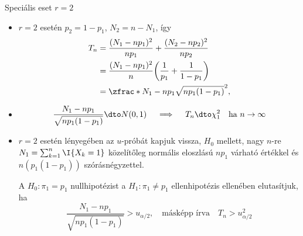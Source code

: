 \documentclass[aspectratio=169,notheorems,9pt,\option]{beamer}
\begin{document}
\begin{frame}{Speciális eset $r=2$}
  
  \begin{itemize}
    \item $r=2$ esetén $p_2=1-p_1$, $N_2=n-N_1$, így
    \begin{align*}
      T_n&=\frac{(N_1-np_1)^2}{np_1}+\frac{(N_2-np_2)^2}{np_2}
      \\
         &=
           \frac{(N_1-np_1)^2}n \zjel*{\frac1{p_1}+\frac1{1-p_1}}
      \\
         &
           =\zfrac*{N_1-np_1}{\sqrt{np_1(1-p_1)}}^2,\\
    \end{align*}
    \item  
    \begin{displaymath}
      \frac{N_1-np_1}{\sqrt{np_1 (1-p_1)}}\dto N (0,1)
      \quad\implies\quad
      T_n\dto \chi^2_1\quad\text{ha $n\to\infty$}
    \end{displaymath}
    \item $r=2$ esetén lényegében az $u$-próbát kapjuk vissza,
    $H_0$ mellett, nagy $n$-re $N_1=\sum_{k=1}^n\I{X_k=1}$ közelítőleg normális eloszlású 
    $np_1$ várható értékkel és $n(p_1(1-p_1))$ szórásnégyzettel.

    A $H_0: \pi_1=p_1$ nullhipotézist a $H_1: \pi_1\neq p_1$ ellenhipotézis
    ellenében elutasítjuk, ha
    \begin{displaymath}
      \frac{N_1-np_1}{\sqrt{np_1 (1-p_1)}}>u_{\alpha/2},\quad
      \text{másképp írva}\quad 
      T_n>u^2_{\alpha/2}
    \end{displaymath}
  \end{itemize}
\end{frame}
\end{document}
